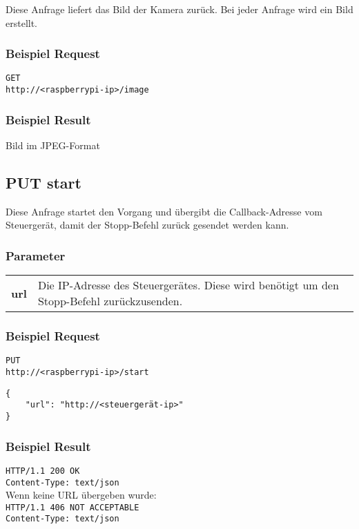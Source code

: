 Diese Anfrage liefert das Bild der Kamera zurück. Bei jeder Anfrage wird ein Bild erstellt.

\subsubsection{Beispiel Request}

\texttt{GET} \\
\texttt{http://<raspberrypi-ip>/image}

\subsubsection{Beispiel Result}

Bild im JPEG-Format

\subsection{PUT start}

Diese Anfrage startet den Vorgang und übergibt die Callback-Adresse vom Steuergerät, damit der Stopp-Befehl zurück gesendet werden kann.

\subsubsection{Parameter}

\begin{tabular}{l p{16cm}}
	\textbf{url} & Die IP-Adresse des Steuergerätes. Diese wird benötigt um den Stopp-Befehl zurückzusenden.
\end{tabular}

\subsubsection{Beispiel Request}

\texttt{PUT} \\
\texttt{http://<raspberrypi-ip>/start}

\begin{lstlisting}[caption=PUT start Request, tabsize=2]
{
	"url": "http://<steuergerät-ip>"
}
\end{lstlisting}

\subsubsection{Beispiel Result}

\texttt{HTTP/1.1 200 OK} \\
\texttt{Content-Type: text/json} \\

\noindent
Wenn keine URL übergeben wurde: \\

\noindent
\texttt{HTTP/1.1 406 NOT ACCEPTABLE} \\
\texttt{Content-Type: text/json}